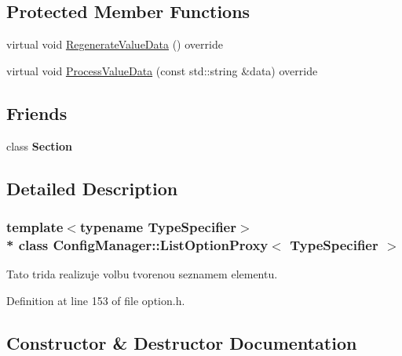 \subsection*{Protected Member Functions}
\begin{DoxyCompactItemize}
\item 
virtual void \hyperlink{class_config_manager_1_1_list_option_proxy_ab7d04f2f12da920861c6cef6d8dca501}{Regenerate\+Value\+Data} () override
\item 
virtual void \hyperlink{class_config_manager_1_1_list_option_proxy_ade1da6bf53c9bef0806755e4f805284e}{Process\+Value\+Data} (const std\+::string \&data) override
\end{DoxyCompactItemize}
\subsection*{Friends}
\begin{DoxyCompactItemize}
\item 
class {\bfseries Section}\hypertarget{class_config_manager_1_1_list_option_proxy_a0bd6fc422149e1c8416770631b28d40c}{}\label{class_config_manager_1_1_list_option_proxy_a0bd6fc422149e1c8416770631b28d40c}

\end{DoxyCompactItemize}


\subsection{Detailed Description}
\subsubsection*{template$<$typename Type\+Specifier$>$\\*
class Config\+Manager\+::\+List\+Option\+Proxy$<$ Type\+Specifier $>$}

Tato trida realizuje volbu tvorenou seznamem elementu. 

Definition at line 153 of file option.\+h.



\subsection{Constructor \& Destructor Documentation}
